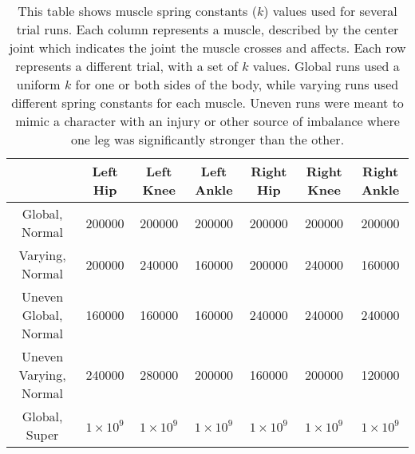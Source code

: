 \begin{table}[ht]
	\centering
	\scriptsize
	\begin{tabular}{| c | c | c | c | c | c | c |}
		\hline
		& Left Hip & Left Knee & Left Ankle & Right Hip & Right Knee & Right Ankle \\ \hline
		Global, Normal & 200000 & 200000 & 200000 & 200000 & 200000 & 200000 \\ \hline
		Varying, Normal & 200000 & 240000 & 160000 & 200000 & 240000 & 160000 \\ \hline
		Uneven Global, Normal & 160000 & 160000 & 160000 & 240000 & 240000 & 240000 \\ \hline
		Uneven Varying, Normal & 240000 & 280000 & 200000 & 160000 & 200000 & 120000 \\ \hline
		Global, Super & $1 \times 10^9$ & $1 \times 10^9$ & $1 \times 10^9$ & $1 \times 10^9$ & $1 \times 10^9$ & $1 \times 10^9$ \\ \hline
	\end{tabular}
	\caption[Table of spring constants for each trial]{This table shows muscle spring constants ($k$) values used for several trial runs.  Each column represents a muscle, described by the center joint which indicates the joint the muscle crosses and affects.  Each row represents a different trial, with a set of $k$ values.  Global runs used a uniform $k$ for one or both sides of the body, while varying runs used different spring constants for each muscle.  Uneven runs were meant to mimic a character with an injury or other source of imbalance where one leg was significantly stronger than the other.}
	\label{tab:run_k_vals}
\end{table}

\newcommand{\floatedfig}[1]{\begin{subfigure}[h]{0.2\textwidth}\texttt{[image: \#1]}\end{subfigure}\hspace{0.025\textwidth}}

